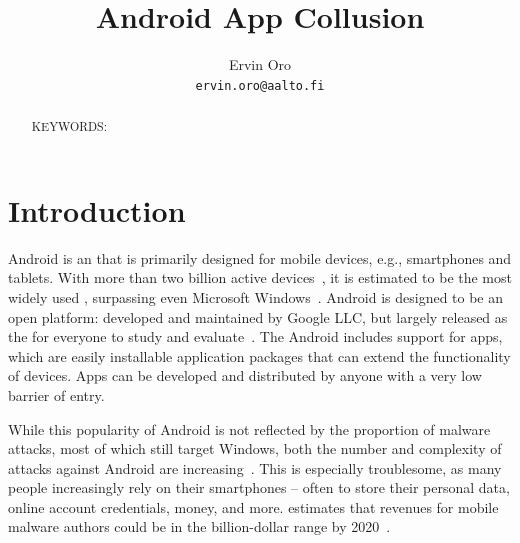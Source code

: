 \documentclass[article, oneside]{aaltoseries}
\title{Android App Collusion}
\author{Ervin Oro%
\\\textnormal{\texttt{ervin.oro@aalto.fi}}} %
\affiliation{\textbf{Tutor}: Jorden Whitefield} %
\newcommand{\TODO}[1]{\todo[inline]{#1}}
\renewcommand\gls\cgls
\begin{document}

\maketitle
{}

\begin{abstract}
\TODO{abstract}

\vspace{3mm}
\noindent KEYWORDS: 

\end{abstract}


\section{Introduction}
\label{sec:intro}

Android is an \gls{os} that is primarily designed for mobile devices, e.g., smartphones and tablets. With more than two billion active devices~\cite{AOSP2018}, it is estimated to be the most widely used \gls{os}, surpassing even Microsoft Windows~\cite{AWSLLC2018, StatCounter2018}. Android is designed to be an open platform: developed and maintained by Google LLC, but largely released as the \citeauthor{AOSP} for everyone to study and evaluate~\cite{AOSP}. The Android \gls{os} includes support for apps, which are easily installable application packages that can extend the functionality of devices. Apps can be developed and distributed by anyone with a very low barrier of entry.

While this popularity of Android is not reflected by the proportion of malware attacks, most of which still target Windows, both the number and complexity of attacks against Android are increasing~\cite{AVTESTGH2018}. This is especially troublesome, as many people increasingly rely on their smartphones -- often to store their personal data, online account credentials, money, and more. \citeauthor{McAfee2018} estimates that revenues for mobile malware authors could be in the billion-dollar range by 2020~\cite{McAfee2018}.
\end{document}
